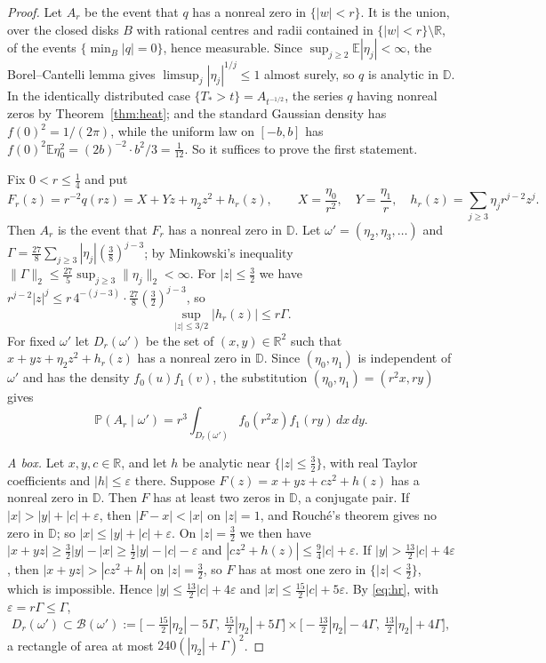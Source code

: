 \documentclass[11pt]{amsart}
\theoremstyle{definition}
\theoremstyle{remark}
\numberwithin{equation}{section}
\newcommand{\R}{\mathbb{R}}
\newcommand{\D}{\mathbb{D}}
\newcommand{\E}{\mathbb{E}}
\newcommand{\PP}{\mathbb{P}}
\newcommand{\eps}{\varepsilon}
\begin{document}
\begin{proof}
Let $A_r$ be the event that $q$ has a nonreal zero in $\{|w|<r\}$. It is the union, over the closed disks $B$ with rational centres and radii contained in $\{|w|<r\}\setminus\R$, of the events $\{\min_B|q|=0\}$, hence measurable. Since $\sup_{j\ge2}\E|\eta_j|<\infty$, the Borel--Cantelli lemma gives $\limsup_j|\eta_j|^{1/j}\le1$ almost surely, so $q$ is analytic in $\D$. In the identically distributed case $\{T_*>t\}=A_{t^{-1/2}}$, the series $q$ having nonreal zeros by Theorem~\ref{thm:heat}; and the standard Gaussian density has $f(0)^2=1/(2\pi)$, while the uniform law on $[-b,b]$ has $f(0)^2\E\eta_0^2=(2b)^{-2}\cdot b^2/3=\frac1{12}$. So it suffices to prove the first statement.

Fix $0<r\le\frac14$ and put
\[
F_r(z)=r^{-2}q(rz)=X+Yz+\eta_2z^2+h_r(z),\qquad X=\frac{\eta_0}{r^2},\quad Y=\frac{\eta_1}{r},\quad h_r(z)=\sum_{j\ge3}\eta_jr^{j-2}z^j .
\]
Then $A_r$ is the event that $F_r$ has a nonreal zero in $\D$. Let $\omega'=(\eta_2,\eta_3,\dots)$ and $\Gamma=\frac{27}8\sum_{j\ge3}|\eta_j|(\frac38)^{j-3}$; by Minkowski's inequality $\|\Gamma\|_2\le\frac{27}5\sup_{j\ge3}\|\eta_j\|_2<\infty$. For $|z|\le\frac32$ we have $r^{j-2}|z|^j\le r\,4^{-(j-3)}\cdot\frac{27}8(\frac32)^{j-3}$, so
\begin{equation}\label{eq:hr}
\sup_{|z|\le3/2}|h_r(z)|\le r\Gamma .
\end{equation}
For fixed $\omega'$ let $D_r(\omega')$ be the set of $(x,y)\in\R^2$ such that $x+yz+\eta_2z^2+h_r(z)$ has a nonreal zero in $\D$. Since $(\eta_0,\eta_1)$ is independent of $\omega'$ and has the density $f_0(u)f_1(v)$, the substitution $(\eta_0,\eta_1)=(r^2x,ry)$ gives
\begin{equation}\label{eq:tail-cond}
\PP(A_r\mid\omega')=r^3\int_{D_r(\omega')}f_0(r^2x)f_1(ry)\,dx\,dy .
\end{equation}

\emph{A box.} Let $x,y,c\in\R$, and let $h$ be analytic near $\{|z|\le\frac32\}$, with real Taylor coefficients and $|h|\le\eps$ there. Suppose $F(z)=x+yz+cz^2+h(z)$ has a nonreal zero in $\D$. Then $F$ has at least two zeros in $\D$, a conjugate pair. If $|x|>|y|+|c|+\eps$, then $|F-x|<|x|$ on $|z|=1$, and Rouch\'e's theorem gives no zero in $\D$; so $|x|\le|y|+|c|+\eps$. On $|z|=\frac32$ we then have $|x+yz|\ge\frac32|y|-|x|\ge\frac12|y|-|c|-\eps$ and $|cz^2+h(z)|\le\frac94|c|+\eps$. If $|y|>\frac{13}2|c|+4\eps$, then $|x+yz|>|cz^2+h|$ on $|z|=\frac32$, so $F$ has at most one zero in $\{|z|<\frac32\}$, which is impossible. Hence $|y|\le\frac{13}2|c|+4\eps$ and $|x|\le\frac{15}2|c|+5\eps$. By \eqref{eq:hr}, with $\eps=r\Gamma\le\Gamma$,
\begin{equation}\label{eq:box}
D_r(\omega')\subset\mathcal B(\omega'):=\bigl[-\tfrac{15}2|\eta_2|-5\Gamma,\ \tfrac{15}2|\eta_2|+5\Gamma\bigr]\times\bigl[-\tfrac{13}2|\eta_2|-4\Gamma,\ \tfrac{13}2|\eta_2|+4\Gamma\bigr],
\end{equation}
a rectangle of area at most $240(|\eta_2|+\Gamma)^2$.


\end{proof}
\end{document}

